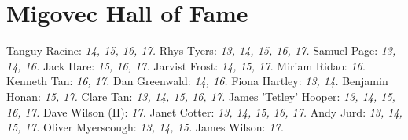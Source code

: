 \section{Migovec Hall of Fame}

Tanguy Racine: \textsl{14, 15, 16, 17.}
Rhys Tyers: \textsl{13, 14, 15, 16, 17.}
Samuel Page: \textsl{13, 14, 16.}
Jack Hare: \textsl{15, 16, 17.}
Jarvist Frost: \textsl{14, 15, 17.}
Miriam Ridao: \textsl{16.}
Kenneth Tan: \textsl{16, 17.}
Dan Greenwald: \textsl{14, 16.}
Fiona Hartley: \textsl{13, 14.}
Benjamin Honan: \textsl{15, 17.}
Clare Tan: \textsl{13, 14, 15, 16, 17.}
James 'Tetley' Hooper: \textsl{13, 14, 15, 16, 17.}
Dave Wilson (II): \textsl{17.}
Janet Cotter: \textsl{13, 14, 15, 16, 17.}
Andy Jurd: \textsl{13, 14, 15, 17.}
Oliver Myerscough: \textsl{13, 14, 15.}
James Wilson: \textsl{17.}
